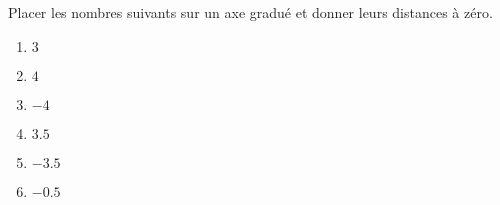 
\begin{exercice}\label{exo2smath-0045}

    Placer les nombres suivants sur un axe gradué et donner leurs distances à zéro.
    \begin{multicols}{3}
        \begin{enumerate}
            \item
                \( 3\)
            \item
                \( 4\)
            \item
                \(-4\)
            \item
                \( 3.5\)
            \item
                \( -3.5\)
            \item
                \( -0.5\)
        \end{enumerate}
    \end{multicols}

\end{exercice}
